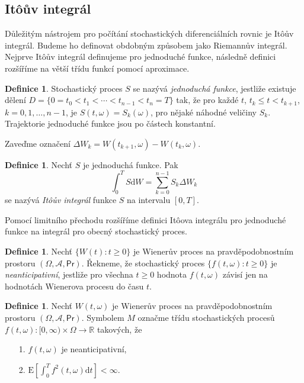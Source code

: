 \documentclass[a4paper,12pt]{report}
\theoremstyle{definition} \newtheorem{definice}[veta]{Definice}
\theoremstyle{remark}
\begin{document}
\subsection{It\^oův integrál}
Důležitým nástrojem pro počítání stochastických diferenciálních rovnic je It\^oův integrál.
Budeme ho definovat obdobným způsobem jako Riemannův integrál.
Nejprve It\^oův integrál definujeme pro jednoduché funkce, následně definici rozšíříme na větší třídu funkcí pomocí aproximace.
\newline
\begin{definice}
Stochastický proces $S$ se nazývá \textit{jednoduchá funkce}, jestliže existuje dělení $D=\{0=t_0<t_1<\cdots<t_{n-1}<t_n=T\}$ tak, že pro každé $t$, $t_k\le t<t_{k+1}$, $k=0,1,\dots,n-1$, je $S(t,\omega)=S_k(\omega)$, pro nějaké náhodné veličiny $S_k$. \newline\newline
Trajektorie jednoduché funkce jsou po částech konstantní. 
\end{definice}


Zaveďme označení $\Delta W_k=W(t_{k+1},\omega)-W(t_k,\omega)$.
\\
\begin{definice}
Nechť $S$ je jednoduchá funkce. Pak
$$\int_0^TS\mathrm{d}W=\sum_{k=0}^{n-1}S_k\Delta W_k$$
se nazývá \textit{It\^oův integrál} funkce $S$ na intervalu $[0,T]$.
\\
\end{definice}

Pomocí limitního přechodu rozšíříme definici It\^oova integrálu pro jednoduché funkce na integrál pro obecný stochastický proces.
\begin{definice}
Nechť $\{W(t):t\ge0\}$ je Wienerův proces na pravdě\-podob\-nostním prostoru $(\Omega,\mathcal{A},\mathsf{Pr})$.
Řekneme, že stochastický proces $\{f(t,\omega):t\ge0\}$ je \textit{neanticipativní}, jestliže pro všechna $t\ge0$ hodnota $f(t,\omega)$ závisí jen na hodnotách Wienerova procesu do času $t$.
\\
\end{definice}

\begin{definice}
Nechť $W(t,\omega)$ je Wienerův proces na pravděpodobnostním prostoru $(\Omega,\mathcal{A},\mathsf{Pr})$.
Symbolem $M$ označme třídu stochastických procesů $f(t,\omega):[0,\infty)\times\Omega\to\mathbb R$ takových, že
\begin{enumerate}
\item[1.] $f(t,\omega)$ je neanticipativní, 
\item[2.] $\text{E}\left[\int_0^Tf^2(t,\omega)\mathrm{d}t\right]<\infty.$ 
\\
\end{enumerate}
\end{definice}
\end{document}
